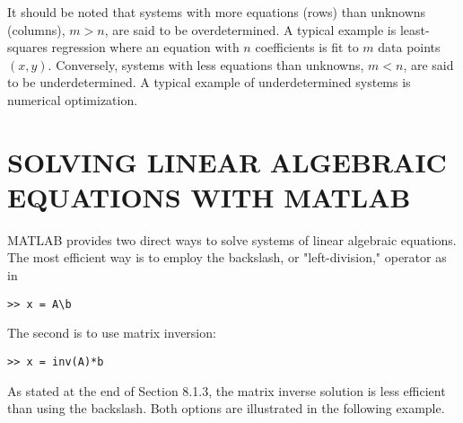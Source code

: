 \documentclass[../main.tex]{subfiles}
\begin{document}
It should be noted that systems with more equations (rows) than unknowns (columns), $m>n$, are said to be overdetermined. A typical example is least-squares regression where an equation with $n$ coefficients is fit to $m$ data points $(x, y)$. Conversely, systems with less equations than unknowns, $m<n$, are said to be underdetermined. A typical example of underdetermined systems is numerical optimization.

\newpage
\section{SOLVING LINEAR ALGEBRAIC EQUATIONS WITH MATLAB}
\label{sec:sec_8_2}

\noindent MATLAB provides two direct ways to solve systems of linear algebraic equations. The most efficient way is to employ the backslash, or "left-division," operator as in

\begin{lstlisting}[numbers=none,frame=none]
    >> x = A\b
\end{lstlisting}

\noindent The second is to use matrix inversion:

\begin{lstlisting}[numbers=none,frame=none]
    >> x = inv(A)*b
\end{lstlisting}

\noindent As stated at the end of Section 8.1.3, the matrix inverse solution is less efficient than using the backslash. Both options are illustrated in the following example.
\end{document}
